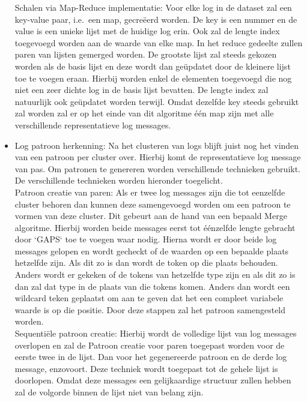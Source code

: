 \begin{itemize}
    \subitem Schalen via Map-Reduce implementatie: Voor elke log in de dataset zal een key-value paar, i.e.\ een map, gecreëerd worden. De key is een nummer en de value is een unieke lijst met de huidige log erin. Ook zal de lengte index toegevoegd worden aan de waarde van elke map. In het reduce gedeelte zullen paren van lijsten gemerged worden. De grootste lijst zal steeds gekozen worden als de basis lijst en deze wordt dan geüpdatet door de kleinere lijst toe te voegen eraan. Hierbij worden enkel de elementen toegevoegd die nog niet een zeer dichte log in de basis lijst bevatten. De lengte index zal natuurlijk ook geüpdatet worden terwijl. Omdat dezelfde key steeds gebruikt zal worden zal er op het einde van dit algoritme één map zijn met alle verschillende representatieve log messages. \\
    
    \item Log patroon herkenning: Na het clusteren van logs blijft juist nog het vinden van een patroon per cluster over. Hierbij komt de representatieve log message van pas. Om patronen te genereren worden verschillende technieken gebruikt. De verschillende technieken worden hieronder toegelicht.\\
    
    \subitem Patroon creatie van paren: Als er twee log messages zijn die tot eenzelfde cluster behoren dan kunnen deze samengevoegd worden om een patroon te vormen van deze cluster. Dit gebeurt aan de hand van een bepaald Merge algoritme. Hierbij worden beide messages eerst tot éénzelfde lengte gebracht door `GAPS` toe te voegen waar nodig. Hierna wordt er door beide log messages gelopen en wordt gecheckt of de waarden op een bepaalde plaats hetzelfde zijn. Als dit zo is dan wordt de token op die plaats behouden. Anders wordt er gekeken of de tokens van hetzelfde type zijn en als dit zo is dan zal dat type in de plaats van die tokens komen. Anders dan wordt een wildcard teken geplaatst om aan te geven dat het een compleet variabele waarde is op die positie. Door deze stappen zal het patroon samengesteld worden.\\
    
    \subitem Sequentiële patroon creatie: Hierbij wordt de volledige lijst van log messages overlopen en zal de Patroon creatie voor paren toegepast worden voor de eerste twee in de lijst. Dan voor het gegenereerde patroon en de derde log message, enzovoort. Deze techniek wordt toegepast tot de gehele lijst is doorlopen. Omdat deze messages een gelijkaardige structuur zullen hebben zal de volgorde binnen de lijst niet van belang zijn.\\
    

\end{itemize}
